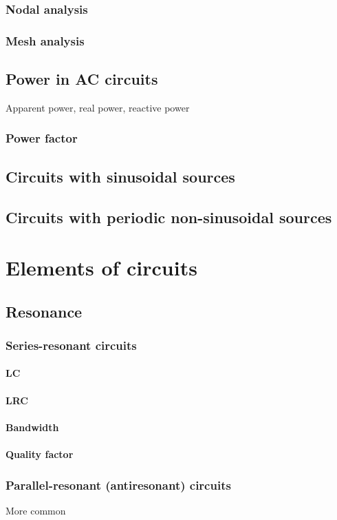 \documentclass{report}
\begin{document}
\subsection{Nodal analysis}
\subsection{Mesh analysis}
\section{Power in AC circuits}
Apparent power, real power, reactive power
\subsection{Power factor}
\section{Circuits with sinusoidal sources}
\section{Circuits with periodic non-sinusoidal sources}

\chapter{Elements of circuits}
\section{Resonance}
\subsection{Series-resonant circuits}
\subsubsection{LC}
\subsubsection{LRC}
\subsubsection{Bandwidth}
\subsubsection{Quality factor}
\subsection{Parallel-resonant (antiresonant) circuits}
More common
\end{document}
